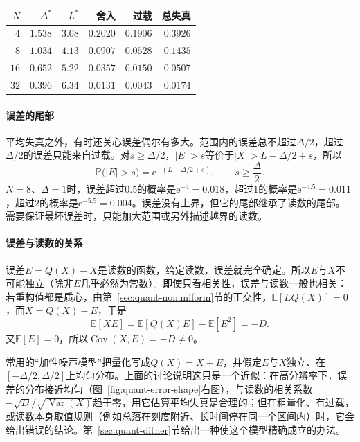 \begin{BookInlineTable}
 \centering
 \begin{tabular}{rrrrrr}
  \toprule
  $N$ & $\Delta^{*}$ & $L^{*}$ & 舍入 & 过载 & 总失真\\
  \midrule
  $4$ & $1.538$ & $3.08$ & $0.2020$ & $0.1906$ & $0.3926$\\
  $8$ & $1.034$ & $4.13$ & $0.0907$ & $0.0528$ & $0.1435$\\
  $16$ & $0.652$ & $5.22$ & $0.0357$ & $0.0150$ & $0.0507$\\
  $32$ & $0.396$ & $6.34$ & $0.0131$ & $0.0043$ & $0.0174$\\
  \bottomrule
 \end{tabular}
 \caption{$\operatorname{Laplace}(0,1)$读数的最优均匀量化器（定长索引）。舍入与过载为精确值；同样点数的Lloyd--Max量化器失真依次为$0.3524$、$0.1090$、$0.0307$、$0.0082$。}
 \label{tab:quant-uniform-points}
\end{BookInlineTable}

\paragraph{误差的尾部}
平均失真之外，有时还关心误差偶尔有多大。范围内的误差总不超过$\Delta/2$，超过$\Delta/2$的误差只能来自过载。对$s\geq\Delta/2$，$\lvert E\rvert>s$等价于$\lvert X\rvert>L-\Delta/2+s$，所以
\[
 \mathbb{P}\bigl(\lvert E\rvert>s\bigr)=\mathrm{e}^{-(L-\Delta/2+s)},\qquad s\geq\frac{\Delta}{2} .
\]
$N=8$、$\Delta=1$时，误差超过$0.5$的概率是$\mathrm{e}^{-4}=0.018$，超过$1$的概率是$\mathrm{e}^{-4.5}=0.011$，超过$2$的概率是$\mathrm{e}^{-5.5}=0.004$。误差没有上界，但它的尾部继承了读数的尾部。需要保证最坏误差时，只能加大范围或另外描述越界的读数。

\paragraph{误差与读数的关系}
误差$E=Q(X)-X$是读数的函数，给定读数，误差就完全确定。所以$E$与$X$不可能独立（除非$E$几乎必然为常数）。即使只看相关性，误差与读数一般也相关：若重构值都是质心，由第~\ref{sec:quant-nonuniform}节的正交性，$\mathbb{E}[EQ(X)]=0$，而$X=Q(X)-E$，于是
\[
 \mathbb{E}[XE]=\mathbb{E}[Q(X)E]-\mathbb{E}[E^{2}]=-D .
\]
又$\mathbb{E}[E]=0$，所以$\operatorname{Cov}(X,E)=-D\neq0$。

常用的“加性噪声模型”把量化写成$Q(X)=X+E$，并假定$E$与$X$独立、在$[-\Delta/2,\Delta/2]$上均匀分布。上面的讨论说明这只是一个近似：在高分辨率下，误差的分布接近均匀（图~\ref{fig:quant-error-shape}右图），与读数的相关系数$-\sqrt{D}/\sqrt{\operatorname{Var}(X)}$趋于零，用它估算平均失真是合理的；但在粗量化、有过载，或读数本身取值规则（例如总落在刻度附近、长时间停在同一个区间内）时，它会给出错误的结论。第~\ref{sec:quant-dither}节给出一种使这个模型精确成立的办法。

